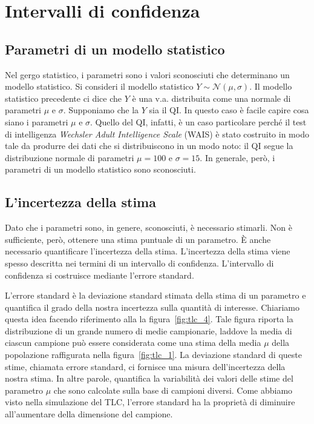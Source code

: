 \section{Intervalli di confidenza}

\subsection{Parametri di un modello statistico}

Nel gergo statistico, i parametri sono i valori sconosciuti che determinano un modello statistico. 
Si consideri il modello statistico $Y \sim \mathcal{N}(\mu, \sigma)$.
Il modello statistico precedente ci dice che $Y$ è una v.a. distribuita come una normale di parametri $\mu$ e $\sigma$.    
Supponiamo che la $Y$ sia il QI.
In questo caso è facile capire cosa siano i parametri $\mu$ e $\sigma$.
Quello del QI, infatti, è un caso particolare perché il test di intelligenza \emph{Wechsler Adult Intelligence Scale} (WAIS) è stato costruito in modo tale da produrre dei dati che si distribuiscono in un modo noto: il QI segue la distribuzione normale di parametri $\mu = 100$ e $\sigma = 15$.
In generale, però, i parametri di un modello statistico sono sconosciuti.


\subsection{L'incertezza della stima}

Dato che i parametri sono, in genere, sconosciuti, è necessario stimarli.
Non è sufficiente, però, ottenere una stima puntuale di un parametro.
È anche necessario quantificare l'incertezza della stima.
L'incertezza della stima viene spesso descritta nei termini di un intervallo di confidenza.
L'intervallo di confidenza si costruisce mediante l'errore standard.

L'errore standard è la deviazione standard stimata della stima di un parametro e quantifica il grado della nostra incertezza sulla quantità di interesse. 
Chiariamo questa idea facendo riferimento alla la figura~\ref{fig:tlc_4}.
Tale figura riporta la distribuzione di un grande numero di medie campionarie, laddove la media di ciascun campione può essere considerata come una stima della media $\mu$ della popolazione raffigurata nella figura~\ref{fig:tlc_1}.
La deviazione standard di queste stime, chiamata errore standard, ci fornisce una misura dell'incertezza della nostra stima.
In altre parole, quantifica la variabilità dei valori delle stime del parametro $\mu$ che sono calcolate sulla base di campioni diversi.
Come abbiamo visto nella simulazione del TLC, l'errore standard ha la proprietà di diminuire all'aumentare della dimensione del campione.

